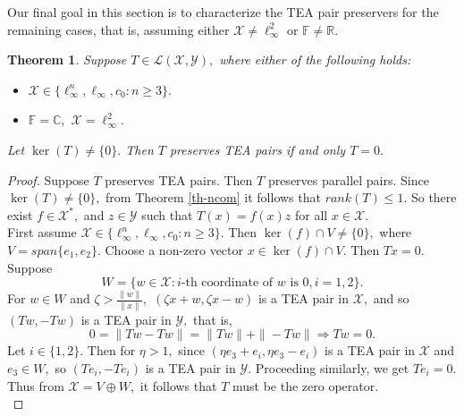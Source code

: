 \documentclass{amsart}
\newtheorem{theorem}{Theorem}[section]
\theoremstyle{definition}
\theoremstyle{remark}
\numberwithin{equation}{section}
\begin{document}
Our final goal in this section is to characterize the TEA pair preservers for the remaining cases, that is, assuming either $\mathcal{X}\neq \ell_\infty^2$ or $\mathbb{F}\neq \mathbb{R}.$
\begin{theorem}\label{th-nteag}
	Suppose $T\in\mathcal{L}(\mathcal{X}, \mathcal{Y}),$ where either of the following holds:
	\begin{itemize}
		\item $\mathcal{X}\in \{\ell_\infty^n,\ell_\infty,c_0:n\geq 3\}.$ 
		\item $\mathbb{F}=\mathbb{C},$ $\mathcal{X}=\ell_\infty^2.$
	\end{itemize}
	Let $\ker(T)\neq \{0\}.$ Then  $T$ preserves TEA pairs if and only $T=0.$
\end{theorem}
\begin{proof}
	Suppose $T$ preserves TEA pairs. Then $T$ preserves parallel pairs. Since $\ker(T)\neq \{0\},$ from Theorem \ref{th-ncom}  it follows that $rank(T)\leq1.$  So there exist $f\in \mathcal{X}^*,$ and $z\in \mathcal{Y}$ such that $T(x)=f(x)z$ for all $x\in \mathcal{X}.$\\
	
	\noindent First assume  $\mathcal{X}\in \{\ell_\infty^n,\ell_\infty,c_0:n\geq 3\}.$ Then $\ker(f)\cap V\neq \{0\},$ where $V=span\{e_1,e_2\}.$ Choose a non-zero vector $x\in \ker(f)\cap V.$ Then $Tx=0.$ Suppose 
	$$W=\{w\in \mathcal{X}:i\text{-th coordinate of }w \text{  is }0, i=1,2 \}.$$ 
	For $w\in W$ and $\zeta>\frac{\|w\|}{\|x\|},$  $(\zeta x+w,\zeta x-w)$ is a TEA pair in $\mathcal{X},$ and so $(Tw,-Tw)$ is a TEA pair in $\mathcal{Y},$ that is,
	\[0=\|Tw-Tw\|=\|Tw\|+\|-Tw\|\Rightarrow Tw=0.\] Let $i\in\{1,2\}.$
	Then for $\eta>1,$ since $(\eta e_3+e_i,\eta e_3-e_i)$ is a TEA pair in $\mathcal{X}$ and $e_3\in W,$ so $(Te_i,-Te_i)$ is a TEA pair in $\mathcal{Y}.$ Proceeding similarly, we get $Te_i=0.$ Thus from $\mathcal{X}=V\oplus W,$ it follows that $T$ must be the zero operator.\\
	

\end{proof}
\end{document}
